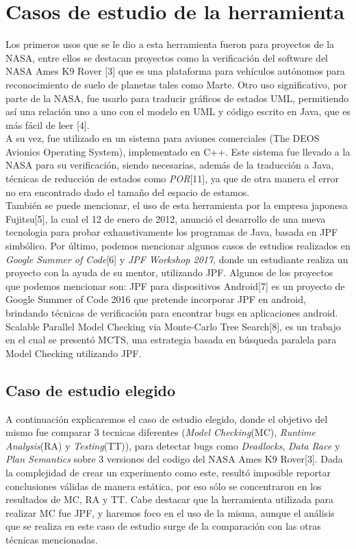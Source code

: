 \documentclass[runningheads]{llncs}
\begin{document}
\section{Casos de estudio de la herramienta}

Los primeros usos que se le dio a esta herramienta fueron para proyectos de la NASA, entre ellos se destacan proyectos como la verificaci\'on del software del NASA Ames K9 Rover [3] que es una plataforma para veh\'iculos aut\'onomos para reconocimiento de suelo de planetas tales como Marte.
Otro uso significativo, por parte de la NASA, fue usarlo para traducir gr\'aficos de estados UML, permitiendo as\'i una relaci\'on uno a uno con el modelo en UML y c\'odigo escrito en Java, que es m\'as f\'acil de leer [4].\\
A su vez, fue utilizado en un sistema para aviones comerciales (The DEOS Avionics Operating System), implementado en C++. Este sistema fue llevado a la NASA para su verificaci\'on, siendo necesarias, adem\'as de la traducci\'on a Java, t\'ecnicas de reducci\'on de estados como \textit{POR}[11], ya que de otra manera el error no era encontrado dado el tama\~no del espacio de estamos.\\
Tambi\'en se puede mencionar, el uso de esta herramienta por la empresa japonesa Fujitsu[5], la cual el 12 de enero de 2012, anunci\'o el desarrollo de una nueva tecnologia para probar exhaustivamente los programas de Java, basada en JPF simb\'olico.
Por \'ultimo, podemos mencionar algunos casos de estudios realizados en \textit{Google Summer of Code}[6] y \textit{JPF Workshop 2017}, donde un estudiante realiza un proyecto con la ayuda de su mentor, utilizando JPF. Algunos de los proyectos que podemos mencionar son: 
JPF para dispositivos Android[7] es un proyecto de Google Summer of Code 2016 que pretende incorporar JPF en android, brindando t\'ecnicas de verificaci\'on para encontrar bugs en aplicaciones android.\\
Scalable Parallel Model Checking via Monte-Carlo Tree Search[8], es un trabajo en el cual se present\'o MCTS, una estrategia basada en b\'usqueda paralela para Model Checking utilizando JPF.\\

\subsection{Caso de estudio elegido}
A continuaci\'on explicaremos el caso de estudio elegido, donde el objetivo del mismo fue comparar 3 tecnicas diferentes (\textit{Model Checking}(MC), \textit{Runtime Analysis}(RA) y \textit{Testing}(TT)), para detectar bugs como \textit{Deadlocks}, \textit{Data Race} y \textit{Plan Semantics} sobre 3 versiones del codigo del NASA Ames K9 Rover[3].
Dada la complejidad de crear un experimento como este, result\'o imposible reportar conclusiones v\'alidas de manera est\'atica, por eso s\'olo se concentraron en los resultados de MC, RA y TT. Cabe destacar que la herramienta utilizada para realizar MC fue JPF, y haremos foco en el uso de la misma, aunque el an\'alisis que se realiza en este caso de estudio surge de la comparaci\'on con las otras t\'ecnicas mencionadas.
\end{document}
